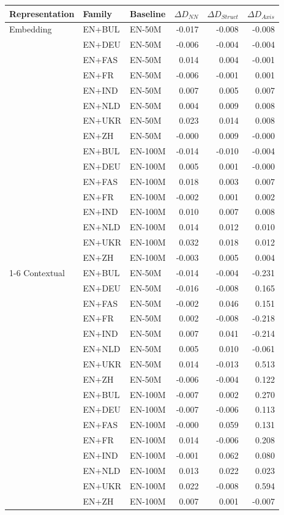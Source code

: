 \begin{tabular}{@{}lllrrr@{}}
\toprule
Representation & Family & Baseline & $\Delta D_{NN}$ & $\Delta D_{Struct}$ & $\Delta D_{Axis}$ \\
\midrule
Embedding & EN+BUL & EN-50M & -0.017 & -0.008 & -0.008 \\
 & EN+DEU & EN-50M & -0.006 & -0.004 & -0.004 \\
 & EN+FAS & EN-50M & 0.014 & 0.004 & -0.001 \\
 & EN+FR & EN-50M & -0.006 & -0.001 & 0.001 \\
 & EN+IND & EN-50M & 0.007 & 0.005 & 0.007 \\
 & EN+NLD & EN-50M & 0.004 & 0.009 & 0.008 \\
 & EN+UKR & EN-50M & 0.023 & 0.014 & 0.008 \\
 & EN+ZH & EN-50M & -0.000 & 0.009 & -0.000 \\
 & EN+BUL & EN-100M & -0.014 & -0.010 & -0.004 \\
 & EN+DEU & EN-100M & 0.005 & 0.001 & -0.000 \\
 & EN+FAS & EN-100M & 0.018 & 0.003 & 0.007 \\
 & EN+FR & EN-100M & -0.002 & 0.001 & 0.002 \\
 & EN+IND & EN-100M & 0.010 & 0.007 & 0.008 \\
 & EN+NLD & EN-100M & 0.014 & 0.012 & 0.010 \\
 & EN+UKR & EN-100M & 0.032 & 0.018 & 0.012 \\
 & EN+ZH & EN-100M & -0.003 & 0.005 & 0.004 \\
\cmidrule(lr){1-6}
Contextual & EN+BUL & EN-50M & -0.014 & -0.004 & -0.231 \\
 & EN+DEU & EN-50M & -0.016 & -0.008 & 0.165 \\
 & EN+FAS & EN-50M & -0.002 & 0.046 & 0.151 \\
 & EN+FR & EN-50M & 0.002 & -0.008 & -0.218 \\
 & EN+IND & EN-50M & 0.007 & 0.041 & -0.214 \\
 & EN+NLD & EN-50M & 0.005 & 0.010 & -0.061 \\
 & EN+UKR & EN-50M & 0.014 & -0.013 & 0.513 \\
 & EN+ZH & EN-50M & -0.006 & -0.004 & 0.122 \\
 & EN+BUL & EN-100M & -0.007 & 0.002 & 0.270 \\
 & EN+DEU & EN-100M & -0.007 & -0.006 & 0.113 \\
 & EN+FAS & EN-100M & -0.000 & 0.059 & 0.131 \\
 & EN+FR & EN-100M & 0.014 & -0.006 & 0.208 \\
 & EN+IND & EN-100M & -0.001 & 0.062 & 0.080 \\
 & EN+NLD & EN-100M & 0.013 & 0.022 & 0.023 \\
 & EN+UKR & EN-100M & 0.022 & -0.008 & 0.594 \\
 & EN+ZH & EN-100M & 0.007 & 0.001 & -0.007 \\
\bottomrule
\end{tabular}
